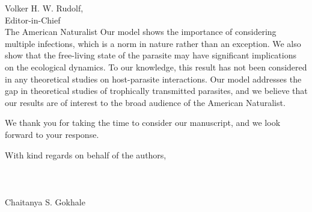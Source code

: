 \documentclass[10,DIN, pagenumber=false, parskip=half,fromalign=right, fromphone=false,fromemail=false, fromurl=false,fromlogo=true, fromrule=false]{scrlttr2}
\begin{document}
\begin{letter}{
\sffamily
\vspace{-0.4cm}
Volker H. W. Rudolf,\\
Editor-in-Chief\\
The American Naturalist
}
Our model shows the importance of considering multiple infections, which is a norm in nature rather than an exception. 
We also show that the free-living state of the parasite may have significant implications on the ecological dynamics.
To our knowledge, this result has not been considered in any theoretical studies on host-parasite interactions. 
Our model addresses the gap in theoretical studies of trophically transmitted parasites, and we believe that our results are of interest to the broad audience of the American Naturalist.

We thank you for taking the time to consider our manuscript, and we look forward to your response.

With kind regards on behalf of the authors,\\
\\
\\
\\
Chaitanya S. Gokhale

\end{letter}
\end{document}
